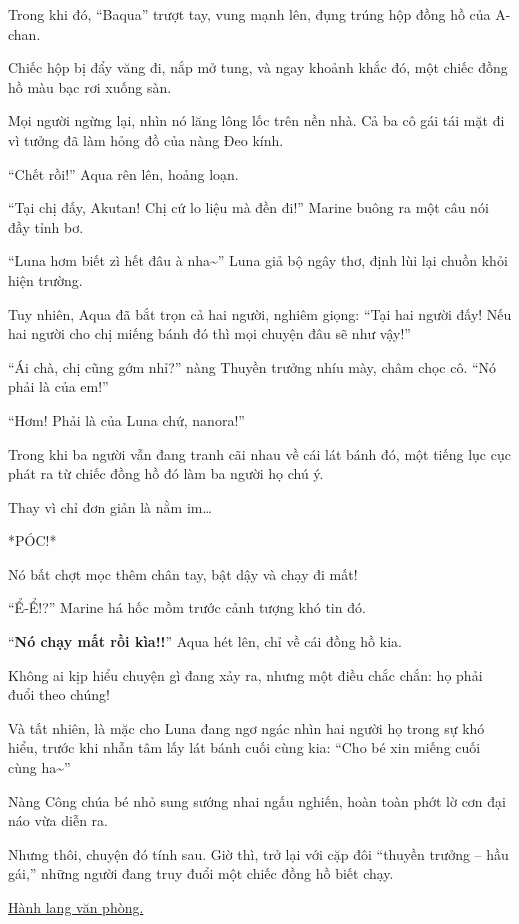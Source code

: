 \documentclass[../main.tex]{subfiles}
\begin{document}
Trong khi đó, ``Baqua'' trượt tay, vung mạnh lên, đụng trúng hộp đồng hồ của A-chan.

Chiếc hộp bị đẩy văng đi, nắp mở tung, và ngay khoảnh khắc đó, một chiếc đồng hồ màu bạc rơi xuống sàn.

Mọi người ngừng lại, nhìn nó lăng lông lốc trên nền nhà. Cả ba cô gái tái mặt đi vì tưởng đã làm hỏng đồ của nàng Đeo kính.

``Chết rồi!'' Aqua rên lên, hoảng loạn.

``Tại chị đấy, Akutan! Chị cứ lo liệu mà đền đi!'' Marine buông ra một câu nói đầy tỉnh bơ.

``Luna hơm biết zì hết đâu à nha\~{}'' Luna giả bộ ngây thơ, định lùi lại chuồn khỏi hiện trường.

Tuy nhiên, Aqua đã bắt trọn cả hai người, nghiêm giọng: ``Tại hai người đấy! Nếu hai người cho chị miếng bánh đó thì mọi chuyện đâu sẽ như vậy!''

``Ái chà, chị cũng gớm nhỉ?'' nàng Thuyền trưởng nhíu mày, châm chọc cô. ``Nó phải là của em!''

``Hơm! Phải là của Luna chứ, nanora!''

Trong khi ba người vẫn đang tranh cãi nhau về cái lát bánh đó, một tiếng lục cục phát ra từ chiếc đồng hồ đó làm ba người họ chú ý.

Thay vì chỉ đơn giản là nằm im\dots

*PÓC!*

Nó bất chợt mọc thêm chân tay, bật dậy và chạy đi mất!

``Ể-Ể!?'' Marine há hốc mồm trước cảnh tượng khó tin đó.

``\textbf{Nó chạy mất rồi kìa!!}'' Aqua hét lên, chỉ về cái đồng hồ kia.

Không ai kịp hiểu chuyện gì đang xảy ra, nhưng một điều chắc chắn: họ phải đuổi theo chúng!


Và tất nhiên, là mặc cho Luna đang ngơ ngác nhìn hai người họ trong sự khó hiểu, trước khi nhẫn tâm lấy lát bánh cuối cùng kia: ``Cho bé xin miếng cuối cùng ha\~{}''

Nàng Công chúa bé nhỏ sung sướng nhai ngấu nghiến, hoàn toàn phớt lờ cơn đại náo vừa diễn ra.

Nhưng thôi, chuyện đó tính sau. Giờ thì, trở lại với cặp đôi ``thuyền trưởng – hầu gái,'' những người đang truy đuổi một chiếc đồng hồ biết chạy.

\ct

\begin{center}
    \uline{Hành lang văn phòng.}
\end{center}
\end{document}
